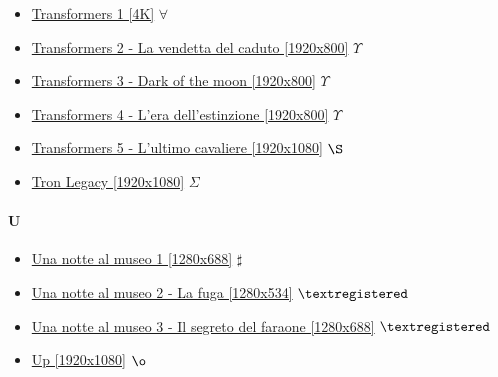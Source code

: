 \begin{itemize}
			\item \href{https://mega.nz/#!muhVgLrC!DTbvF5cKJYZHlkbE7sEqrBZTWQ2bi5t1qt8_iRBYQdw} {Transformers 1  [4K]}  $\forall$ \\
			\item \href{https://mega.nz/#!UyYTjRRR!8dB2CJSfcyz-zEEgj9nIjWPUyKr_EVO260Ejcpy5NkM} {Transformers 2 - La vendetta del caduto [1920x800]}  $\Upsilon$ \\
			\item \href{https://mega.nz/#!cqohUIzS!KUdDeornKtzSdmF0TLY52nAJYoTB9l7eGhxamUN7Oio} {Transformers 3 - Dark of the moon [1920x800]}  $\Upsilon$ \\
			\item \href{https://mega.nz/#!pvAQiJaA!8OIOTkwXPf4yvf-vHLO43IULj42Ct_64aO_3qt8xz0g} {Transformers 4 - L'era dell'estinzione [1920x800]}  $\Upsilon$ \\
			\item \href{https://mega.nz/#!DDgCTIQI!WP9WgjdLnItgm1ArQFXRqJZX1LEkhJ4iTuAwUGCWLJ4} {Transformers 5 - L'ultimo cavaliere [1920x1080]}  $\S$ \\
			\item \href{https://mega.nz/#!AmxxSToC!vgyH_0ZEsADMFq17SYaQnISTwtvumfN3S-9PcKtQUx8} {Tron Legacy [1920x1080]}  $\Sigma$ \\
		
		\end{itemize}
	
	\paragraph{U} \hypertarget{FIU}{}
		\begin{itemize}
			
			\item \href{https://mega.nz/#!82BHhQTY!t3y8dTEVe1ek4FpeUgwiBE3Zs8WNupqGBJs9sYsS1ds} {Una notte al museo 1 [1280x688]}  $\sharp$ \\ 
			\item \href{https://mega.nz/#!TjRmgboa!hOYTx3UxNYqXHyROujLGnYLNQTcGkbASBhtfytZhpm0} {Una notte al museo 2 - La fuga [1280x534]}  $\textregistered$ \\ 
			\item \href{https://mega.nz/#!WywSxRSS!VUpn7-4jl81X3Sqfh-gwA8sGE52799rTACKm95NrAeE} {Una notte al museo 3 - Il segreto del faraone [1280x688]}  $\textregistered$ \\ 
			\item \href{https://mega.nz/#!QlxlECbD!iaaNlHWvAxfbeX1xtYfC9Ej7DtXxfu3DA9gn8wLmTBA} {Up [1920x1080]}  $\o$ \\ 
				
	\end{itemize}	

